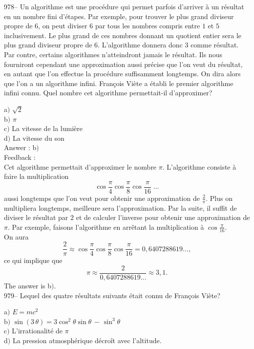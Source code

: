 ﻿\documentclass[letterpaper, 12pt]{article}
\begin{document}
978-- Un algorithme est une proc\'edure qui permet parfois d'arriver
\`a un r\'esultat en un nombre fini d'\'etapes. Par exemple, pour
trouver le plus grand diviseur propre de $6$, on peut diviser $6$
par tous les nombres compris entre $1$ et $5$ inclusivement. Le plus
grand de ces nombres donnant un quotient entier sera le plus grand
diviseur propre de $6$. L'algorithme donnera donc $3$ comme
r\'esultat. Par contre, certains algorithmes n'atteindront jamais le
r\'esultat. Ils nous fourniront cependant une approximation aussi
pr\'ecise que l'on veut du r\'esultat, en autant que l'on effectue
la proc\'edure suffisamment longtemps. On dira alors que l'on a un
algorithme infini. Fran\c cois Vi\`ete a \'etabli le premier
algorithme infini connu. Quel nombre cet algorithme permettait-il
d'approximer?

a$)$ $\sqrt2$ \\
b$)$ $\pi$ \\
c$)$ La vitesse de la lumi\`ere \\
d$)$ La vitesse du son\\

Answer : b$)$\\

Feedback : \\
Cet algorithme permettait d'approximer le nombre $\pi$. L'algorithme
consiste \`a faire la multiplication
$$\displaystyle{\cos\frac{\pi}4\cos\frac{\pi}8\cos\frac{\pi}{16}\;\ldots}$$
aussi longtemps que l'on veut pour obtenir une approximation de
$\frac2{\pi}$. Plus on multipliera longtemps, meilleure sera
l'approximation. Par la suite, il suffit de diviser le r\'esultat
par $2$ et de calculer l'inverse
pour obtenir une approximation de $\pi$. Par exemple, faisons l'algorithme
en arr\^etant la multiplication \`a $\cos\frac{\pi}{16}$.\\
On aura
$$
\displaystyle{\frac2{\pi}}  \approx
\displaystyle{\cos\frac{\pi}4\cos\frac{\pi}8\cos\frac{\pi}{16}}
                               =     0,640 728 861 9\ldots,
$$
ce qui implique que
$$
\pi  \approx  \displaystyle{\frac2{0,640 728 861 9\ldots}}
     \approx  3,1.
$$
The answer is b$)$.\\

979-- Lequel des quatre r\'esultats suivants \'etait connu de Fran\c
cois Vi\`ete?

a$)$ $E=mc^2$\\
b$)$ $\sin(3\,\theta)=3\cos^2\theta\sin\theta\,-\,\sin^3\theta$ \\
c$)$ L'irrationalit\'e de $\pi$ \\
d$)$ La pression atmosph\'erique d\'ecro\^it avec l'altitude.\\
\end{document}
